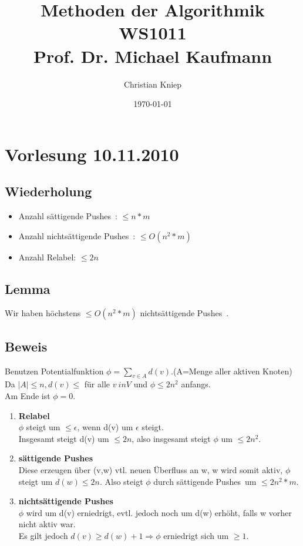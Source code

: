\documentclass[11pt]{article}
\author{Christian Kniep}
\title{Methoden der Algorithmik WS1011 \\ Prof. Dr. Michael Kaufmann}
\date{\today}
\newcommand{\pns}{nichts\"attigende Pushes\ }
\newcommand{\ps}{s\"attigende Pushes\ }
\begin{document}
\maketitle
\section{Vorlesung 10.11.2010}
\subsection{Wiederholung}
\begin{itemize}
    \item Anzahl \ps: $\leq n*m$
    \item Anzahl \pns: $\leq O(n^2*m)$
    \item Anzahl Relabel: $\leq 2n$
\end{itemize}

\subsection{Lemma}
Wir haben h\"ochstens $\leq O(n^2*m)$ \pns.
\subsection{Beweis}
Benutzen Potentialfunktion $\phi = \displaystyle\sum_{v \in A} d(v)$.(A=Menge aller aktiven Knoten) \\
Da $|A| \leq n, d(v) \leq$ f\"ur alle $v \ in V$ und $\phi \leq 2n^2$ anfangs.\\
Am Ende ist $\phi = 0$.
\begin{enumerate}
    \item \textbf{Relabel} \\
        $\phi$ steigt um $\leq \epsilon$, wenn  d(v) um $\epsilon$ steigt.\\
        Insgesamt steigt d(v) um $\leq 2n$, also insgesamt steigt $\phi$ um $\leq 2n^2$.
    \item \textbf{\ps} \\
        Diese erzeugen \"uber (v,w) vtl. neuen \"Uberfluss an w, w wird somit aktiv, $\phi$ steigt um $d(w) \leq 2n$.
        Also steigt $\phi$ durch \ps um $\leq 2n^2*m$.
    \item \textbf{\pns} \\
        $\phi$ wird um d(v) erniedrigt, evtl. jedoch noch um d(w) erh\"oht, falls w vorher nicht aktiv war. \\
        Es gilt jedoch $d(v) \geq d(w) + 1 \Rightarrow \phi$ erniedrigt sich um $\geq 1$.
\end{enumerate}
\end{document}
